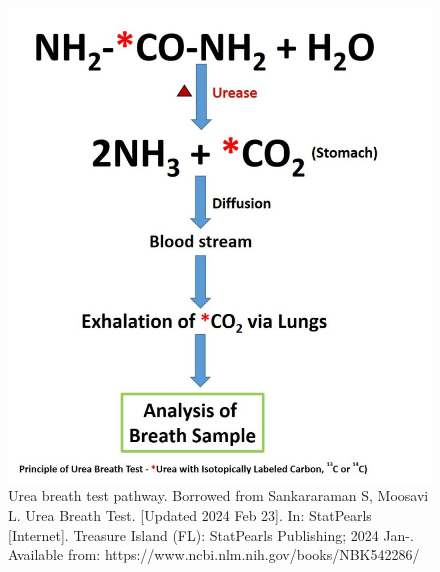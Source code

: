 \begin{figure}[!ht]
    \centering
    \includegraphics[width=1\linewidth]{./figure/urea_test.jpg}
    \caption{Urea breath test pathway. Borrowed from  Sankararaman S, Moosavi L. Urea Breath Test. [Updated 2024 Feb 23]. 
    In: StatPearls [Internet]. Treasure Island (FL): StatPearls Publishing; 2024 Jan-. Available 
    from: https://www.ncbi.nlm.nih.gov/books/NBK542286/}
    \label{fig:urea_test}
\end{figure}

